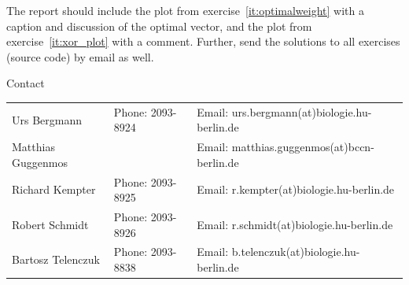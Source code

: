 \documentclass[12pt, a4]{article}
\begin{document}
The report should include the plot from exercise~\ref{it:optimalweight} 
with a caption and discussion of the optimal vector, and the plot from 
exercise~\ref{it:xor_plot} with a comment. Further, send the solutions to all 
exercises (source code) by email as well.

\vfill
\centerline{\CAP Contact}
\CAP

\begin{tabular}{lll}
Urs Bergmann & Phone: 2093-8924 & Email:
urs.bergmann(at)biologie.hu-berlin.de \\
Matthias Guggenmos & & Email: matthias.guggenmos(at)bccn-berlin.de \\
Richard Kempter \hfill & Phone: 2093-8925 \hfill & Email:
r.kempter(at)biologie.hu-berlin.de \\
Robert Schmidt & Phone: 2093-8926 & Email: r.schmidt(at)biologie.hu-berlin.de
\\
Bartosz Telenczuk & Phone: 2093-8838 & Email:
b.telenczuk(at)biologie.hu-berlin.de \\
\end{tabular}
\end{document}
